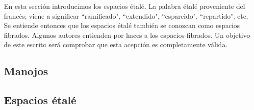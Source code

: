 En esta sección introducimos los espacios étalé. La palabra étalé proveniente del francés; viene a significar ``ramificado", ``extendido", ``esparcido", ``repartido", etc. Se entiende entonces que los espacios étalé también se conozcan como espacios fibrados. Algunos autores entienden por haces a los espacios fibrados. Un objetivo de este escrito será comprobar que esta acepción es completamente válida.
\subsection{Manojos}
   
\subsection{Espacios étalé}
   
